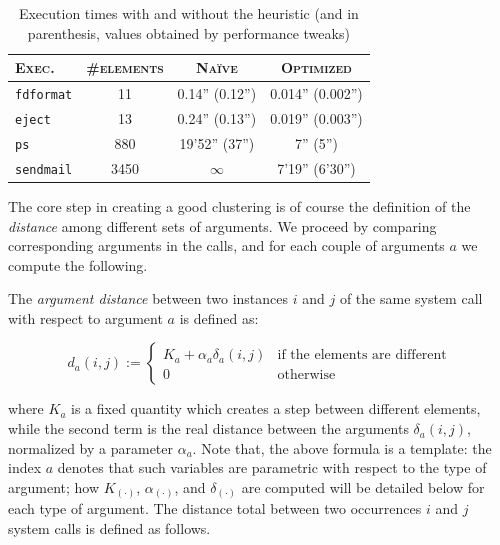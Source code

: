\begin{table}[t]
  \centering
  \begin{tabular}{lccc}
    \toprule
    \textsc{Exec.} & \textsc{\#elements} & \textsc{Na\"ive} & \textsc{Optimized}\\
    \midrule
    \texttt{fdformat} & 11 & 0.14'' (0.12'') & 0.014'' (0.002'') \\
    \texttt{eject} & 13 & 0.24'' (0.13'') & 0.019'' (0.003'')\\
    \texttt{ps} & 880 & 19'52'' (37'') & 7'' (5'') \\
    \texttt{sendmail} & 3450 & $\infty$ & 7'19'' (6'30'')\\
    \bottomrule
  \end{tabular}
  \caption{Execution times with and without the heuristic (and in parenthesis, values obtained by performance tweaks)}
  \label{tab:exec-times}
\end{table}

The core step in creating a good clustering is of course the
definition of the \emph{distance} among different sets of
arguments. We proceed by comparing corresponding arguments in the
calls, and for each couple of arguments $a$ we compute the following.

\begin{definition}
  The \emph{argument distance} between two instances $i$ and $j$ of
  the same system call with respect to argument $a$ is defined as:

  \begin{equation}
    d_a(i,j) := \left\{
      \begin{array}{lll}
        K_a + \alpha_{a} \delta_{a}(i,j) & \mbox{if the elements are different} \\
        0           & \mbox{otherwise}
      \end{array}
    \right.
    \label{eq:distfunction}
  \end{equation}
\end{definition}

\noindent where $K_{a}$ is a fixed quantity which creates a step
between different elements, while the second term is the real distance
between the arguments $\delta_{a}(i,j)$, normalized by a parameter
$\alpha_{a}$. Note that, the above formula is a template: the index
$a$ denotes that such variables are parametric with respect to the
type of argument; how $K_{(\cdot)}$, $\alpha_{(\cdot)}$, and
$\delta_{(\cdot)}$ are computed will be detailed below for each type
of argument. The distance total between two occurrences $i$ and $j$
system calls is defined as follows.

